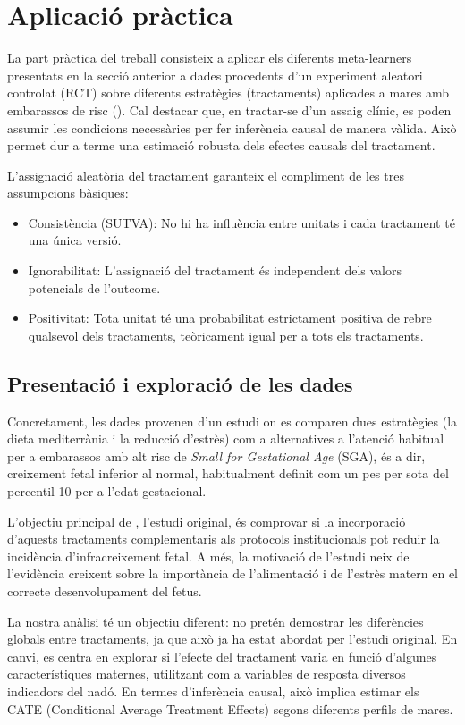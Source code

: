 \documentclass[../main.tex]{subfiles}
\begin{document}
    \chapter{Aplicació pràctica} \label{ch:pract}
    La part pràctica del treball consisteix a aplicar els diferents meta-learners presentats en la secció anterior a dades procedents d’un experiment aleatori controlat (RCT) sobre diferents estratègies (tractaments) aplicades a mares amb embarassos de risc (\cite{parct_original}). Cal destacar que, en tractar-se d’un assaig clínic, es poden assumir les condicions necessàries per fer inferència causal de manera vàlida. Això permet dur a terme una estimació robusta dels efectes causals del tractament.\par
    L’assignació aleatòria del tractament garanteix el compliment de les tres assumpcions bàsiques:
    \begin{itemize}
        \item Consistència (SUTVA): No hi ha influència entre unitats i cada tractament té una única versió.
        \item Ignorabilitat: L’assignació del tractament és independent dels valors potencials de l'outcome.
        \item Positivitat: Tota unitat té una probabilitat estrictament positiva de rebre qualsevol dels tractaments, teòricament igual per a tots els tractaments.
    \end{itemize}

    \section{Presentació i exploració de les dades}\label{sec:pers_dades}
    Concretament, les dades provenen d’un estudi on es comparen dues estratègies (la dieta mediterrània i la reducció d'estrès) com a alternatives a l’atenció habitual per a embarassos amb alt risc de \textit{Small for Gestational Age} (SGA), és a dir, creixement fetal inferior al normal, habitualment definit com un pes per sota del percentil 10 per a l’edat gestacional.\par
    L’objectiu principal de \cite{parct_original} , l’estudi original, és comprovar si la incorporació d’aquests tractaments complementaris als protocols institucionals pot reduir la incidència d’infracreixement fetal. A més, la motivació de l’estudi neix de l’evidència creixent sobre la importància de l’alimentació i de l’estrès matern en el correcte desenvolupament del fetus.\par
    La nostra anàlisi té un objectiu diferent: no pretén demostrar les diferències globals entre tractaments, ja que això ja ha estat abordat per l’estudi original. En canvi, es centra en explorar si l’efecte del tractament varia en funció d’algunes característiques maternes, utilitzant com a variables de resposta diversos indicadors del nadó. En termes d’inferència causal, això implica estimar els CATE (Conditional Average Treatment Effects) segons diferents perfils de mares.\par
\end{document}
